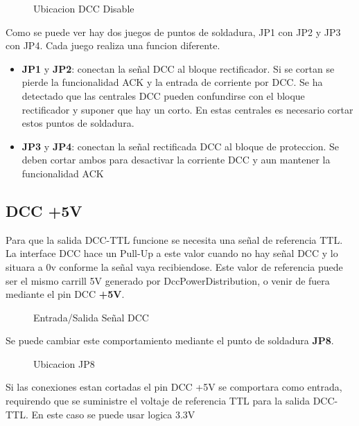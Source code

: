 \begin{figure}[H]
    \centering
    
    \caption{Ubicacion DCC Disable}
    \label{fig:DccDisable}
\end{figure}

Como se puede ver hay dos juegos de puntos de soldadura, JP1 con JP2 y JP3 con JP4. Cada juego
realiza una funcion diferente.
\begin{itemize}
    \item \textbf{JP1} y \textbf{JP2}: conectan la señal DCC al bloque rectificador. Si se cortan
se pierde la funcionalidad ACK y la entrada de corriente por DCC. Se ha detectado que las centrales
DCC pueden confundirse con el bloque rectificador y suponer que hay un corto. En estas centrales
es necesario cortar estos puntos de soldadura.
    \item \textbf{JP3} y \textbf{JP4}: conectan la señal rectificada DCC al bloque de proteccion.
    Se deben cortar ambos para desactivar la corriente DCC y aun mantener la funcionalidad ACK
        
\end{itemize}

\subsection{DCC +5V}
Para que la salida DCC-TTL funcione se necesita una señal de referencia TTL. La interface DCC hace un
Pull-Up a este valor cuando no hay señal DCC y lo situara a 0v conforme la señal vaya recibiendose.
Este valor de referencia puede ser el mismo carrill 5V generado por DccPowerDistribution, o venir de
fuera mediante el pin DCC \textbf{+5V}.

\begin{figure}[H]
    \centering
    
    \caption{Entrada/Salida Señal DCC}
    \label{fig:DccOut2}
\end{figure}

Se puede cambiar este comportamiento mediante el punto de soldadura \textbf{JP8}.

\begin{figure}[H]
    \centering
    
    \caption{Ubicacion JP8}
    \label{fig:Jp8Loc}
\end{figure}

Si las conexiones estan cortadas el pin DCC +5V se comportara como entrada, requirendo que se suministre
el voltaje de referencia TTL para la salida DCC-TTL. En este caso se puede usar logica 3.3V

